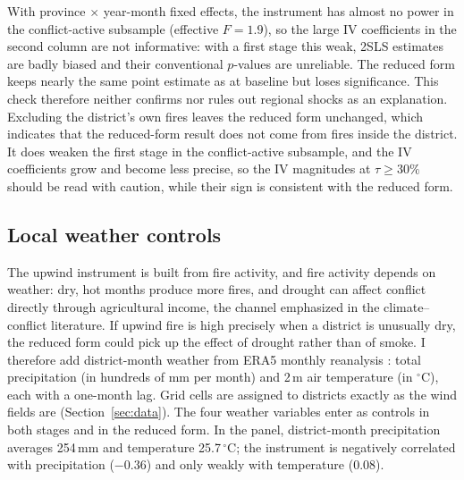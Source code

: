 \documentclass[12pt]{article}
\begin{document}
With province $\times$ year-month fixed effects, the instrument has almost no power in the conflict-active subsample (effective $F = 1.9$), so the large IV coefficients in the second column are not informative: with a first stage this weak, 2SLS estimates are badly biased and their conventional $p$-values are unreliable. The reduced form keeps nearly the same point estimate as at baseline but loses significance. This check therefore neither confirms nor rules out regional shocks as an explanation. Excluding the district's own fires leaves the reduced form unchanged, which indicates that the reduced-form result does not come from fires inside the district. It does weaken the first stage in the conflict-active subsample, and the IV coefficients grow and become less precise, so the IV magnitudes at $\tau \geq 30\%$ should be read with caution, while their sign is consistent with the reduced form.

\subsection{Local weather controls}
\label{sec:weather}

The upwind instrument is built from fire activity, and fire activity depends on weather: dry, hot months produce more fires, and drought can affect conflict directly through agricultural income, the channel emphasized in the climate--conflict literature. If upwind fire is high precisely when a district is unusually dry, the reduced form could pick up the effect of drought rather than of smoke. I therefore add district-month weather from ERA5 monthly reanalysis \citep{hersbach2023era5}: total precipitation (in hundreds of mm per month) and 2\,m air temperature (in $^{\circ}$C), each with a one-month lag. Grid cells are assigned to districts exactly as the wind fields are (Section~\ref{sec:data}). The four weather variables enter as controls in both stages and in the reduced form. In the panel, district-month precipitation averages 254\,mm and temperature 25.7\,$^{\circ}$C; the instrument is negatively correlated with precipitation ($-0.36$) and only weakly with temperature ($0.08$).
\end{document}
